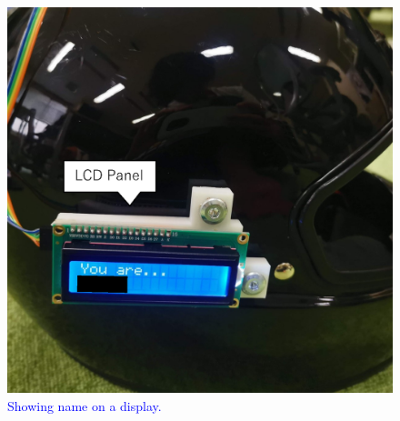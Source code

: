 \documentclass[sigchi,authordraft]{acmart}
\newcommand\figref[1]{\textbf{Figure~\ref{fig:#1}}}
\begin{document}
\begin{figure}[!t]
  \begin{center}
    \includegraphics[width=0.6\linewidth]{figure/lcd.eps}
  \end{center}
  \caption{\textcolor{blue}{Showing name on a display.}}
  \label{fig:lcd}
\end{figure}



\end{document}
